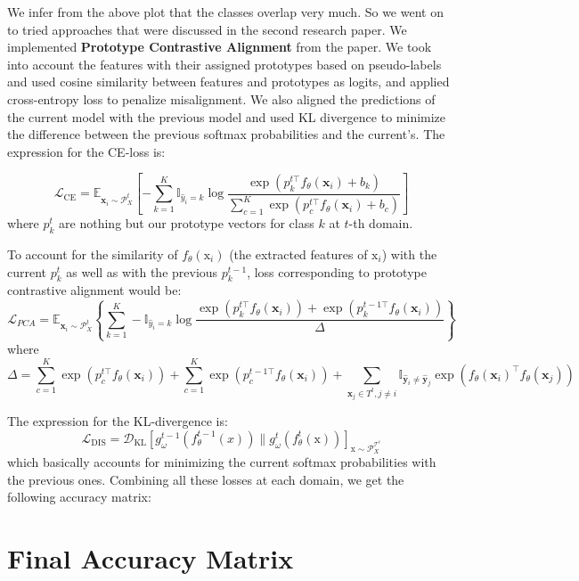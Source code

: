 \documentclass{article} %
\begin{document}
We infer from the above plot that the classes overlap very much. So we went on to tried approaches that were discussed in the second research paper. We implemented \textbf{Prototype Contrastive Alignment} from the paper. We took into account the features with their assigned prototypes based on pseudo-labels and used cosine similarity between features and prototypes as logits, and applied cross-entropy loss to penalize misalignment. We also aligned the predictions of the current model with the previous model and used KL divergence to minimize the difference between the previous softmax probabilities and the current's. The expression for the CE-loss is: 

$$\mathcal{L}_{\text{CE}} = \mathbb{E}_{\textbf{x}_i \sim \mathcal{P}_X^t} \left[ - \sum_{k=1}^K \mathbb{I}_{\hat{y}_i = k} \log \frac{\exp \left( p_k^{t \top} f_\theta(\textbf{x}_i) + b_k \right)}{\sum_{c=1}^K \exp \left( p_c^{t \top} f_\theta(\textbf{x}_i) + b_c \right)} \right]$$
where $p_k^t$ are nothing but our prototype vectors for class $k$ at $t$-th domain. 

To account for the similarity of $f_\theta(\text{x}_i)$ (the extracted features of $\text{x}_i$) with the current $p_k^t$ as well as with the previous $p_k^{t - 1}$, loss corresponding to prototype contrastive alignment would be: 
\[\mathcal{L}_{PCA} = \mathbb{E}_{\textbf{x}_i \sim \mathcal{P}_X^t} \left\{\sum_{k=1}^K -\mathbb{I}_{\hat{y}_i = k} \log \frac{\exp \left( p_k^{t \top} f_\theta(\textbf{x}_i) \right) + \exp \left( p_k^{t-1 \top} f_\theta(\textbf{x}_i) \right)}{\Delta}\right \}
\]
where 
$$ \Delta = \sum_{c=1}^K \exp \left( p_c^{t \top} f_\theta(\textbf{x}_i) \right) + \sum_{c=1}^K \exp \left( p_c^{t-1 \top} f_\theta(\textbf{x}_i) \right) +\sum_{\textbf{x}_j \in T^t, j \neq i} \mathbb{I}_{\hat{\textbf{y}}_i \neq \hat{\textbf{y}}_j} \exp \left( f_\theta(\textbf{x}_i)^{\top} f_\theta(\textbf{x}_j) \right) $$

The expression for the KL-divergence is: 
$$\mathcal{L}_{\text{DIS}} = \mathcal{D}_{\text{KL}} [g_\omega^{t-1} (f_\theta^{t-1} (x)) \| g_\omega^t (f_\theta^t(\text{x}))]_{\text{x} \sim \mathcal{P}_X^{\mathcal{T}^t}}$$
which basically accounts for minimizing the current softmax probabilities with the previous ones. Combining all these losses at each domain, we get the following accuracy matrix: 
\section*{Final Accuracy Matrix}
\end{document}

